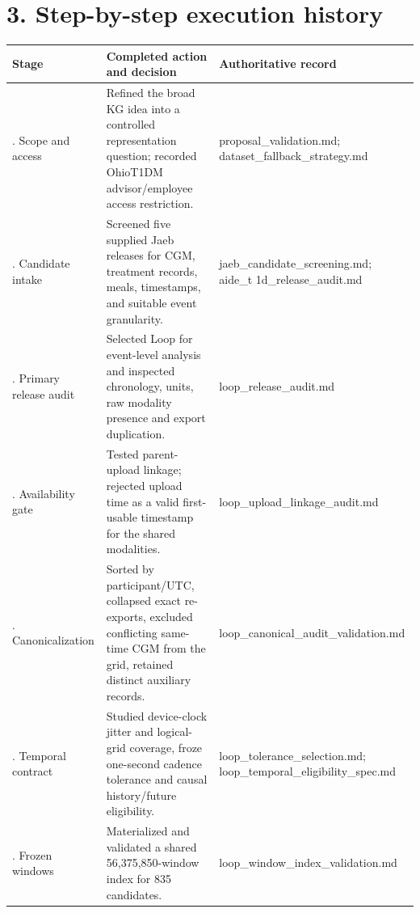 \documentclass[11pt,a4paper]{article}
\begin{document}
\section*{3. Step-by-step execution history}
{\small
\setlength{\tabcolsep}{3pt}
\begin{longtable}{>{\raggedright\arraybackslash}p{}>{\raggedright\arraybackslash}p{}>{\raggedright\arraybackslash}p{}}
\toprule
\textbf{Stage} & \textbf{Completed action and decision} & \textbf{Authoritative record} \\ \midrule
\endhead
1. Scope and access & Refined the broad KG idea into a controlled representation question; recorded OhioT1DM advisor/employee access restriction. & proposal\_\allowbreak{}validation.md; dataset\_\allowbreak{}fallback\_\allowbreak{}strategy.md \\
2. Candidate intake & Screened five supplied Jaeb releases for CGM, treatment records, meals, timestamps, and suitable event granularity. & jaeb\_\allowbreak{}candidate\_\allowbreak{}screening.md; aide\_\allowbreak{}t 1d\_\allowbreak{}release\_\allowbreak{}audit.md \\
3. Primary release audit & Selected Loop for event-level analysis and inspected chronology, units, raw modality presence and export duplication. & loop\_\allowbreak{}release\_\allowbreak{}audit.md \\
4. Availability gate & Tested parent-upload linkage; rejected upload time as a valid first-usable timestamp for the shared modalities. & loop\_\allowbreak{}upload\_\allowbreak{}linkage\_\allowbreak{}audit.md \\
5. Canonicalization & Sorted by participant/UTC, collapsed exact re-exports, excluded conflicting same-time CGM from the grid, retained distinct auxiliary records. & loop\_\allowbreak{}canonical\_\allowbreak{}audit\_\allowbreak{}validation.md \\
6. Temporal contract & Studied device-clock jitter and logical-grid coverage, froze one-second cadence tolerance and causal history/future eligibility. & loop\_\allowbreak{}tolerance\_\allowbreak{}selection.md; loop\_\allowbreak{}temporal\_\allowbreak{}eligibility\_\allowbreak{}spec.md \\
7. Frozen windows & Materialized and validated a shared 56,375,850-window index for 835 candidates. & loop\_\allowbreak{}window\_\allowbreak{}index\_\allowbreak{}validation.md \\

\end{longtable}}
\end{document}
